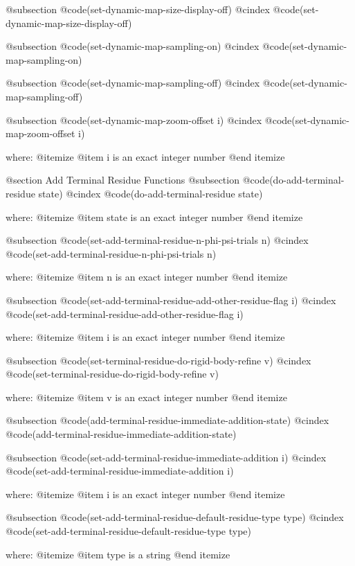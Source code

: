 @subsection @code{(set-dynamic-map-size-display-off)}
@cindex @code{(set-dynamic-map-size-display-off)}
 
@subsection @code{(set-dynamic-map-sampling-on)}
@cindex @code{(set-dynamic-map-sampling-on)}
 
@subsection @code{(set-dynamic-map-sampling-off)}
@cindex @code{(set-dynamic-map-sampling-off)}
 
@subsection @code{(set-dynamic-map-zoom-offset i)}
@cindex @code{(set-dynamic-map-zoom-offset i)}
 
where: 
 @itemize 
     @item i is an exact integer number
 @end itemize



@section Add Terminal Residue Functions 
@subsection @code{(do-add-terminal-residue state)}
@cindex @code{(do-add-terminal-residue state)}
 
where: 
 @itemize 
     @item state is an exact integer number
 @end itemize


@subsection @code{(set-add-terminal-residue-n-phi-psi-trials n)}
@cindex @code{(set-add-terminal-residue-n-phi-psi-trials n)}
 
where: 
 @itemize 
     @item n is an exact integer number
 @end itemize


@subsection @code{(set-add-terminal-residue-add-other-residue-flag i)}
@cindex @code{(set-add-terminal-residue-add-other-residue-flag i)}
 
where: 
 @itemize 
     @item i is an exact integer number
 @end itemize


@subsection @code{(set-terminal-residue-do-rigid-body-refine v)}
@cindex @code{(set-terminal-residue-do-rigid-body-refine v)}
 
where: 
 @itemize 
     @item v is an exact integer number
 @end itemize


@subsection @code{(add-terminal-residue-immediate-addition-state)}
@cindex @code{(add-terminal-residue-immediate-addition-state)}
 
@subsection @code{(set-add-terminal-residue-immediate-addition i)}
@cindex @code{(set-add-terminal-residue-immediate-addition i)}
 
where: 
 @itemize 
     @item i is an exact integer number
 @end itemize


@subsection @code{(set-add-terminal-residue-default-residue-type type)}
@cindex @code{(set-add-terminal-residue-default-residue-type type)}
 
where: 
 @itemize 
     @item type is a string
 @end itemize



